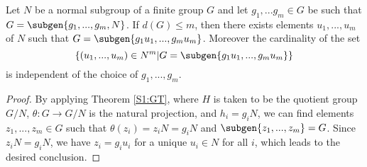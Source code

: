 \begin{theorem}
    \label{GaschutzT}
    Let $N$ be a normal subgroup of a finite group $G$ and let $g_1, ... g_m \in G$ be such that $G = \subgen{g_1, ..., g_m, N}$. 
    If $d(G) \le m$, then there exists elements $u_1, ..., u_m$ of $N$ such that $G = \subgen{g_1u_1, ..., g_mu_m}$. 
    Moreover the cardinality of the set $$\left\{(u_1,...,u_m) \in N^m | G = \subgen{g_1u_1, ..., g_mu_m} \right\}$$ is independent of the choice of $g_1, ..., g_m$.
\end{theorem}
\begin{proof}
By applying Theorem \ref{S1:GT}, where $H$ is taken to be the quotient group $G/N$, $\theta \colon G \rightarrow G/N$ is the natural projection, and $h_i = g_iN$, we can find elements $z_1, ..., z_m \in G$ such that $\theta(z_i) = z_iN = g_iN$ and $\subgen{z_1, ..., z_m} = G$. Since $z_iN = g_iN$, we have $z_i = g_iu_i$ for a unique $u_i \in N$ for all $i$, which leads to the desired conclusion.
\end{proof}
